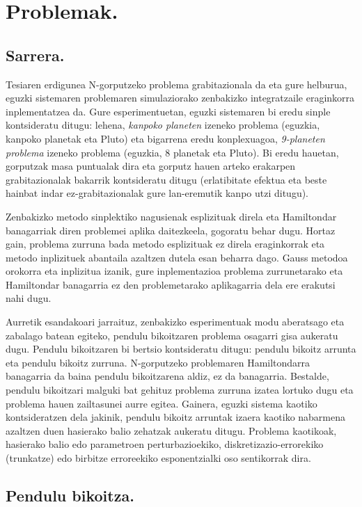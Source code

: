 \chapter{Problemak.}

\section{Sarrera.}


Tesiaren erdigunea N-gorputzeko problema grabitazionala da eta gure helburua, eguzki sistemaren problemaren simulaziorako zenbakizko integratzaile eraginkorra inplementatzea da. Gure esperimentuetan, eguzki sistemaren bi eredu sinple kontsideratu ditugu: lehena, \emph{kanpoko planeten} izeneko problema (eguzkia, kanpoko planetak eta Pluto) eta bigarrena eredu konplexuagoa, \emph{9-planeten problema} izeneko problema (eguzkia, 8 planetak eta Pluto). Bi eredu hauetan, gorputzak masa puntualak dira eta gorputz hauen arteko erakarpen grabitazionalak bakarrik kontsideratu ditugu (erlatibitate efektua eta beste hainbat indar ez-grabitazionalak gure lan-eremutik kanpo utzi ditugu).

Zenbakizko metodo sinplektiko nagusienak esplizituak direla eta Hamiltondar banagarriak diren problemei aplika daitezkeela, gogoratu behar dugu. Hortaz gain, problema zurruna bada metodo esplizituak ez direla eraginkorrak eta metodo inplizituek abantaila azaltzen dutela esan beharra dago. Gauss metodoa orokorra  eta inplizitua izanik, gure inplementazioa problema zurrunetarako eta Hamiltondar banagarria ez den problemetarako  aplikagarria dela ere erakutsi nahi dugu. 
 
Aurretik esandakoari jarraituz, zenbakizko esperimentuak modu aberatsago eta zabalago batean egiteko, pendulu bikoitzaren problema osagarri gisa aukeratu dugu. Pendulu bikoitzaren bi bertsio kontsideratu ditugu: pendulu bikoitz arrunta eta pendulu bikoitz zurruna. N-gorputzeko problemaren Hamiltondarra banagarria da baina pendulu bikoitzarena aldiz, ez da banagarria. Bestalde, pendulu bikoitzari malguki bat gehituz  problema zurruna izatea lortuko dugu eta problema hauen zailtasunei aurre egitea. Gainera,  eguzki sistema kaotiko  kontsideratzen dela \cite{Laskar1999} jakinik, pendulu bikoitz arruntak izaera kaotiko nabarmena azaltzen duen hasierako balio zehatzak aukeratu ditugu. Problema kaotikoak,  hasierako balio edo parametroen perturbazioekiko, diskretizazio-errorekiko (trunkatze) edo birbitze erroreekiko esponentzialki oso sentikorrak dira.


\section{Pendulu bikoitza.}
\label{s:32}


